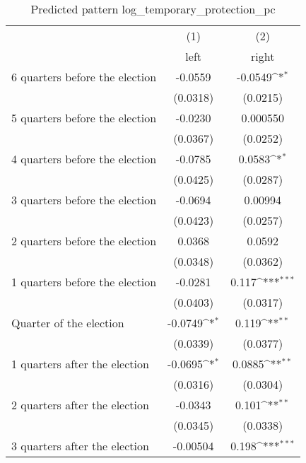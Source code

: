 \begin{table}[htbp]\centering
\def\sym#1{\ifmmode^{#1}\else\(^{#1}\)\fi}
\caption{Predicted pattern log\_temporary\_protection\_pc}
\begin{tabular}{l*{2}{c}}
\hline\hline
                    &\multicolumn{1}{c}{(1)}&\multicolumn{1}{c}{(2)}\\
                    &\multicolumn{1}{c}{left}&\multicolumn{1}{c}{right}\\
\hline
 6 quarters before the election&     -0.0559         &     -0.0549\sym{*}  \\
                    &    (0.0318)         &    (0.0215)         \\
[1em]
 5 quarters before the election&     -0.0230         &    0.000550         \\
                    &    (0.0367)         &    (0.0252)         \\
[1em]
 4 quarters before the election&     -0.0785         &      0.0583\sym{*}  \\
                    &    (0.0425)         &    (0.0287)         \\
[1em]
 3 quarters before the election&     -0.0694         &     0.00994         \\
                    &    (0.0423)         &    (0.0257)         \\
[1em]
 2 quarters before the election&      0.0368         &      0.0592         \\
                    &    (0.0348)         &    (0.0362)         \\
[1em]
 1 quarters before the election&     -0.0281         &       0.117\sym{***}\\
                    &    (0.0403)         &    (0.0317)         \\
[1em]
Quarter of the election&     -0.0749\sym{*}  &       0.119\sym{**} \\
                    &    (0.0339)         &    (0.0377)         \\
[1em]
 1 quarters after the election&     -0.0695\sym{*}  &      0.0885\sym{**} \\
                    &    (0.0316)         &    (0.0304)         \\
[1em]
 2 quarters after the election&     -0.0343         &       0.101\sym{**} \\
                    &    (0.0345)         &    (0.0338)         \\
[1em]
 3 quarters after the election&    -0.00504         &       0.198\sym{***}\\

\end{tabular}
\end{table}
